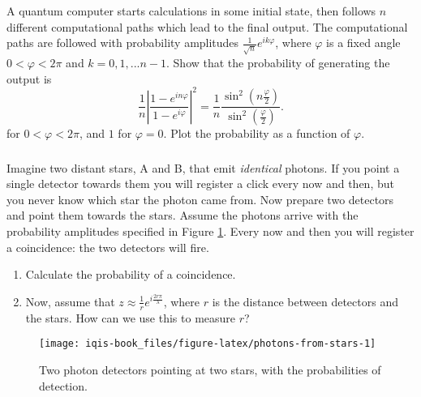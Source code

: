 \documentclass[fleqn]{article}
\providecommand{\tightlist}{%
  \setlength{\itemsep}{0pt}\setlength{\parskip}{0pt}}
\renewcommand{\footnote}[1]{\en{#1}}
\begin{document}
\hypertarget{section-3}{%
\subsubsection{}\label{section-3}}

A quantum computer starts calculations in some initial state, then follows \(n\) different computational paths which lead to the final output.
The computational paths are followed with probability amplitudes \(\frac{1}{\sqrt n}e^{i k \varphi}\), where \(\varphi\) is a fixed angle \(0< \varphi <2\pi\) and \(k=0,1,...n-1\).
Show that the probability of generating the output is\footnote{\(1+z+z^2+\ldots + z^n= \frac{1-z^{n+1}}{1-z}\)}
\[
  \frac{1}{n}\left\vert
    \frac{1-e^{i n\varphi}}{1-e^{i\varphi}}
  \right\vert^2
  = \frac{1}{n} \frac{\sin^2 (n\frac{\varphi}{2})}{\sin^2 (\frac{\varphi}{2})}.
\]
for \(0<\varphi<2\pi\), and \(1\) for \(\varphi=0\).
Plot the probability as a function of \(\varphi\).

\hypertarget{section-4}{%
\subsubsection{}\label{section-4}}

Imagine two distant stars, A and B, that emit \emph{identical} photons.
If you point a single detector towards them you will register a click every now and then, but you never know which star the photon came from.
Now prepare two detectors and point them towards the stars.
Assume the photons arrive with the probability amplitudes specified in Figure \ref{fig:photons-from-stars}.
Every now and then you will register a coincidence: the two detectors will fire.

\begin{enumerate}
\def\labelenumi{\alph{enumi}.}
\tightlist
\item
  Calculate the probability of a coincidence.
\item
  Now, assume that \(z\approx \frac{1}{r}e^{i\frac{2r\pi}{\lambda}}\), where \(r\) is the distance between detectors and the stars. How can we use this to measure \(r\)?
\end{enumerate}

\begin{figure}[H]

{\centering \texttt{[image: iqis-book\_files/figure-latex/photons-from-stars-1]} 

}

\caption{Two photon detectors pointing at two stars, with the probabilities of detection.}\label{fig:photons-from-stars}
\end{figure}
\end{document}
